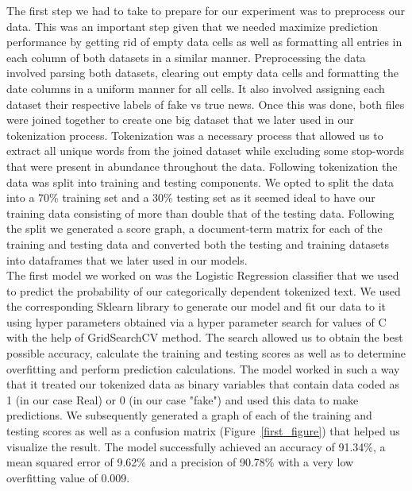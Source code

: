 \documentclass[10pt,twocolumn,letterpaper]{article}
\begin{document}
The first step we had to take to prepare for our experiment was to preprocess our data. This was an important step given that we needed maximize prediction performance by getting rid of empty data cells as well as formatting all entries in each column of both datasets in a similar manner. Preprocessing the data involved parsing both datasets, clearing out empty data cells and formatting the date columns in a uniform manner for all cells. It also involved assigning each dataset their respective labels of fake vs true news. Once this was done, both files were joined together to create one big dataset that we later used in our tokenization process. Tokenization was a necessary process that allowed us to extract all unique words from the joined dataset while excluding some stop-words that were present in abundance throughout the data. Following tokenization the data was split into training and testing components. We opted to split the data into a 70\% training set and a 30\% testing set as it seemed ideal to have our training data consisting of more than double that of the testing data. Following the split we generated a score graph, a document-term matrix for each of the training and testing data and converted both the testing and training datasets into dataframes that we later used in our models. \\

The first model we worked on was the Logistic Regression classifier that we used to predict the probability of our categorically dependent tokenized text. We used the corresponding Sklearn library to generate our model and fit our data to it using hyper parameters obtained via a hyper parameter search for values of C with the help of GridSearchCV method. The search allowed us to obtain the best possible accuracy, calculate the training and testing scores as well as to determine overfitting and perform prediction calculations. The model worked in such a way that it treated our tokenized data as binary variables that contain data coded as 1 (in our case Real) or 0 (in our case "fake") and used this data to make predictions. We subsequently generated a graph of each of the training and testing scores as well as a confusion matrix (Figure~\ref{first_figure}) that helped us visualize the result. The model successfully achieved an accuracy of 91.34\%, a mean squared error of 9.62\% and a precision of 90.78\% with a very low overfitting value of 0.009. \\
\end{document}
